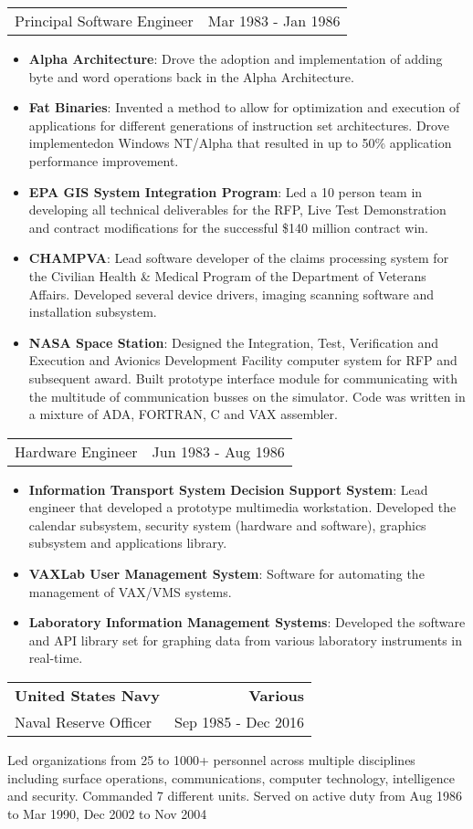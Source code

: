 \documentclass[letterpaper,11pt]{article}
\makeatletter
\newcommand{\resumeSubheading}[4]{
  \vspace{-1pt}
    \item
    \begin{tabular*}{1.0\textwidth}[t]{l@{\extracolsep{\fill}}r}
      \textbf{\Large#1} & \textbf{#2} \\
      {\large #3} & {\large #4}
    \end{tabular*}\vspace{-5pt}
  }
\newcommand{\resumeSubSubheading}[2]{
    \vspace{-1pt}
      \item
      \begin{tabular*}{1.0\textwidth}{l@{\extracolsep{\fill}}r}
        {\large #1} & {#2}
    \end{tabular*}\vspace{-5pt}
}
\newcommand{\resumeJobDescription}[1][]{
    \vspace{-1pt}\par{#1}
}
\newcommand{\resumeItem}[2]{\item{{\textbf{\small#1}}: {\small#2 \vspace{-1pt}}}}
\newcommand{\resumeItemListStart}{\begin{itemize}}
\newcommand{\resumeItemListEnd}{\end{itemize}}\vspace{-10pt}
\makeatother
\begin{document}
        \resumeSubSubheading
          {Principal Software Engineer}{Mar 1983 - Jan 1986}
          \resumeItemListStart
            \resumeItem{Alpha Architecture}{Drove the adoption and implementation of adding byte and word operations back in the Alpha Architecture.}
            \resumeItem{Fat Binaries}{Invented a method to allow for optimization and execution of applications for different generations 
              of instruction set architectures.  Drove implementedon Windows NT/Alpha that resulted in up to 50\% application performance improvement.}
            \resumeItem{EPA GIS System Integration Program}{Led a 10 person team in developing all technical deliverables for the RFP, Live Test Demonstration and contract
              modifications for the successful \$140 million contract win.}
            \resumeItem{CHAMPVA}{Lead software developer of the claims processing system for the Civilian Health \& Medical Program of the 
              Department of Veterans Affairs.  Developed several device drivers, imaging scanning software and installation subsystem.}
            \resumeItem{NASA Space Station}{Designed the Integration, Test, Verification and Execution and Avionics Development Facility computer system for 
              RFP and subsequent award. Built  prototype interface module for communicating with the multitude of communication busses on the simulator. 
              Code was written in a mixture of ADA, FORTRAN, C and VAX assembler.}
          \resumeItemListEnd
    
        \resumeSubSubheading
          {Hardware Engineer}{Jun 1983 - Aug 1986}
            \resumeItemListStart
                \resumeItem{Information Transport System Decision Support System}{Lead engineer that developed a prototype multimedia workstation. 
                            Developed the calendar subsystem, security system (hardware and software), graphics subsystem and applications library.}
                \resumeItem{VAXLab User Management System}{Software for automating the management of VAX/VMS systems.}
                \resumeItem{Laboratory Information Management Systems}{Developed the software and API library set for graphing 
                            data from various laboratory instruments in real-time.}
            \resumeItemListEnd
  
        \resumeSubheading
          {United States Navy}{Various}
          {Naval Reserve Officer}{Sep 1985 - Dec 2016}
          \resumeJobDescription{Led organizations from 25 to 1000+ personnel across multiple disciplines including surface operations, communications, 
          computer technology, intelligence and security. Commanded 7 different units.  Served on active duty from Aug 1986 to Mar 1990, Dec 2002 to Nov 2004}
            
\end{document}
